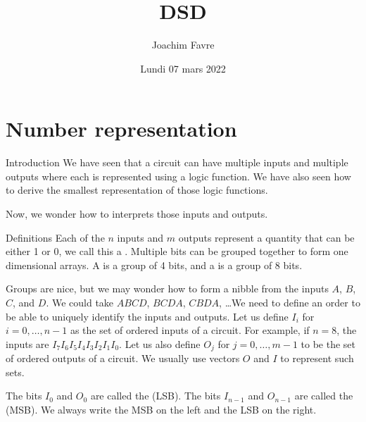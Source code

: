 \documentclass[a4paper]{article}
\title{DSD}
\author{Joachim Favre}
\date{Lundi 07 mars 2022}
\begin{document}
\maketitle


\section{Number representation}

\begin{parag}{Introduction}
    We have seen that a circuit can have multiple inputs and multiple outputs where each is represented using a logic function. We have also seen how to derive the smallest representation of those logic functions.

    Now, we wonder how to interprets those inputs and outputs. 
\end{parag}

\begin{parag}{Definitions}
    Each of the $n$ inputs and $m$ outputs represent a quantity that can be either 1 or 0, we call this a . Multiple bits can be grouped together to form one dimensional arrays. A  is a group of 4 bits, and a  is a group of 8 bits.

    Groups are nice, but we may wonder how to form a nibble from the inputs $A$, $B$, $C$, and $D$. We could take $ABCD$, $BCDA$, $CBDA$, \ldots We need to define an order to be able to uniquely identify the inputs and outputs. Let us define $I_i$ for $i = 0, \ldots, n-1$ as the set of ordered inputs of a circuit. For example, if $n = 8$, the inputs are $I_7 I_6 I_5 I_4 I_3 I_2 I_1 I_0$. Let us also define $O_j$ for $j = 0, \ldots, m-1$ to be the set of ordered outputs of a circuit. We usually use vectors $O$ and $I$ to represent such sets.

    The bits $I_0$ and $O_0$ are called the  (LSB). The bits $I_{n-1}$ and $O_{n-1}$ are called the  (MSB). We always write the MSB on the left and the LSB on the right.
\end{parag}
\end{document}
